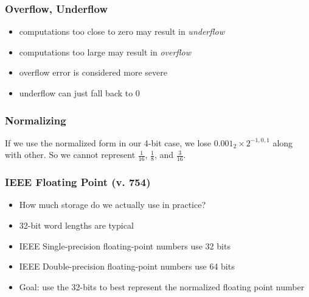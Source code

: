 \documentclass[10pt]{beamer}
\begin{document}
\begin{frame}
\frametitle{Overflow, Underflow}
\begin{center}
\end{center}
\begin{itemize}
  \item computations too close to zero may result in \emph{underflow}
  \item computations too large may result in \emph{overflow}
  \item overflow error is considered more severe
  \item underflow can just fall back to 0
\end{itemize}
\end{frame}
\begin{frame}
\frametitle{Normalizing}
If we use the normalized form in our 4-bit case, we lose $0.001_2\times
2^{-1,0,1}$ along with other.  So we cannot represent
$\frac{1}{16}$,
$\frac{1}{8}$,
and $\frac{3}{16}$.

\begin{center}
\end{center}
\begin{center}
\end{center}

\end{frame}
\begin{frame}
\frametitle{IEEE Floating Point (v. 754)}
  \begin{itemize}
  \item How much storage do we actually use in practice?
  \item 32-bit word lengths are typical
  \item IEEE Single-precision floating-point numbers use 32 bits
  \item IEEE Double-precision floating-point numbers use 64 bits
  \item Goal: use the 32-bits to best represent the normalized floating
point number
\end{itemize}
\begin{center}
\end{center}
\begin{center}
\end{center}
\end{frame}
\end{document}
